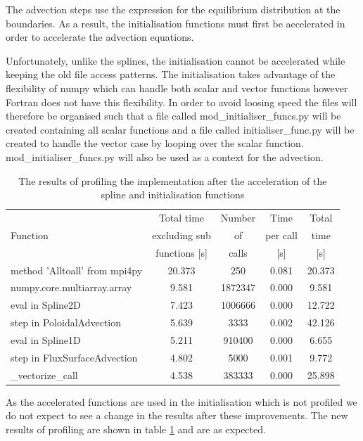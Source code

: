 The advection steps use the expression for the equilibrium distribution at the boundaries. As a result, the initialisation functions must first be accelerated in order to accelerate the advection equations.

Unfortunately, unlike the splines, the initialisation cannot be accelerated while keeping the old file access patterns. The initialisation takes advantage of the flexibility of numpy which can handle both scalar and vector functions however Fortran does not have this flexibility. In order to avoid loosing speed the files will therefore be organised such that a file called mod\_initialiser\_funcs.py will be created containing all scalar functions and a file called initialiser\_func.py will be created to handle the vector case by looping over the scalar function. mod\_initialiser\_funcs.py will also be used as a context for the advection.

\begin{table}[ht]
\centering
 \begin{tabular}{|m{}|c|c|c|c|}
  \hline
          & Total time & Number & Time & Total \\
  Function & excluding sub & of & per call & time \\
          & functions [s] & calls & [s] & [s] \\
  \hline
  \hline
  method 'Alltoall' from mpi4py & 20.373 &  250 & 0.081 & 20.373 \\
  \hline
  numpy.core.multiarray.array & 9.581 &   1872347 & 0.000 & 9.581 \\
  \hline
  eval in Spline2D & 7.423 &   1006666 & 0.000 & 12.722\\
  \hline
  step in PoloidalAdvection & 5.639 &      3333 & 0.002 & 42.126\\
  \hline
  eval in Spline1D & 5.211 & 910400 & 0.000 & 6.655\\
  \hline
  step in FluxSurfaceAdvection & 4.802 & 5000 & 0.001 & 9.772\\
  \hline
  \_vectorize\_call & 4.538 & 383333 & 0.000 & 25.898\\
  \hline
 \end{tabular}
 \caption{\label{tab::init profile} The results of profiling the implementation after the acceleration of the spline and initialisation functions}
\end{table}

As the accelerated functions are used in the initialisation which is not profiled we do not expect to see a change in the results after these improvements. The new results of profiling are shown in table \ref{tab::init profile} and are as expected.

